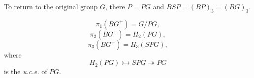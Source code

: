 To return to the original group $G$, there $P = PG$ and $BSP = (BP)_3 = (BG)_3$.
\begin{corollary}
 \[  \pi_1(BG^+)= G/PG ,\]
\[ \pi_2(BG^+)=H_2(PG),\] 
\[ \pi_3(BG^+)=H_3(SPG),\]
where
\[ H_2(PG) \rightarrowtail  SPG\twoheadrightarrow PG\]
is the {\em u.c.e.} of $PG$.
\end{corollary}

